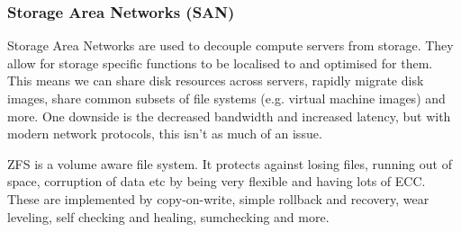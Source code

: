 \subsubsection{Storage Area Networks (SAN)}

Storage Area Networks are used to decouple compute servers from storage. They
allow for storage specific functions to be localised to and optimised for them.
This means we can share disk resources across servers, rapidly migrate disk
images, share common subsets of file systems (e.g. virtual machine images) and
more. One downside is the decreased bandwidth and increased latency, but with
modern network protocols, this isn't as much of an issue.

ZFS is a volume aware file system. It protects against losing files, running out
of space, corruption of data etc by being very flexible and having lots of ECC.
These are implemented by copy-on-write, simple rollback and recovery, wear
leveling, self checking and healing, sumchecking and more.
